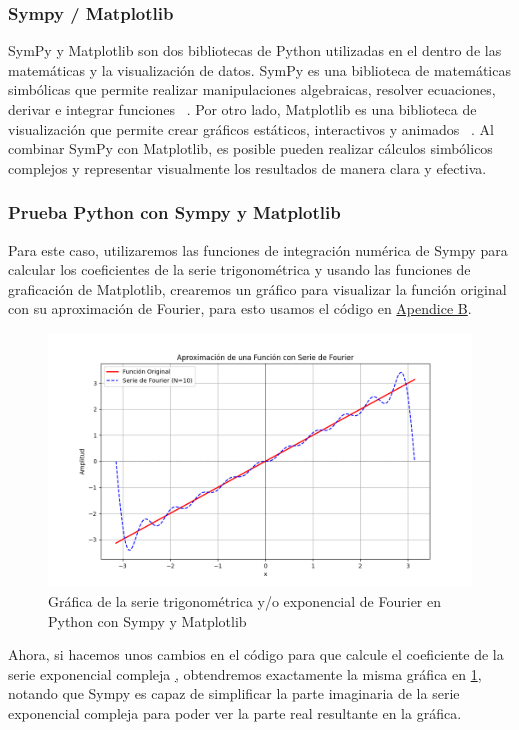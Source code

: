 \subsubsection{Sympy / Matplotlib}
SymPy y Matplotlib son dos bibliotecas de Python utilizadas en el dentro de las matemáticas y la visualización de datos. SymPy es una biblioteca de matemáticas simbólicas que permite realizar manipulaciones algebraicas, resolver ecuaciones, derivar e integrar funciones ~\cite{sympy2024}. Por otro lado, Matplotlib es una biblioteca de visualización que permite crear gráficos estáticos, interactivos y animados ~\cite{matplotlib2024}. Al combinar SymPy con Matplotlib, es posible pueden realizar cálculos simbólicos complejos y representar visualmente los resultados de manera clara y efectiva. 
\subsubsection{Prueba Python con Sympy y Matplotlib}
Para este caso, utilizaremos las funciones de integración numérica de Sympy para calcular los coeficientes de la serie trigonométrica y usando las funciones de graficación de Matplotlib, crearemos un gráfico para visualizar la función original con su aproximación de Fourier, para esto usamos el código en \hyperref[app2:complex-code-python-matplotlib-sympy]{Apendice B}. 
\begin{figure}[H]
	\centering
	\includegraphics[width=1\textwidth]{img/chapter02/python-sympy-matplotlib.png}
	\caption{Gráfica de la serie trigonométrica y/o exponencial de Fourier en Python con Sympy y Matplotlib}
	\label{fig:python-matplotlib-sympy-trig-series}  %
\end{figure}
Ahora, si hacemos unos cambios en el código para que calcule el coeficiente de la serie exponencial compleja \hyperref[app2:complex-code-python-matplotlib-sympy], obtendremos exactamente la misma gráfica en \ref{fig:python-matplotlib-sympy-trig-series}, notando que Sympy es capaz de simplificar la parte imaginaria de la serie exponencial compleja para poder ver la parte real resultante en la gráfica.

